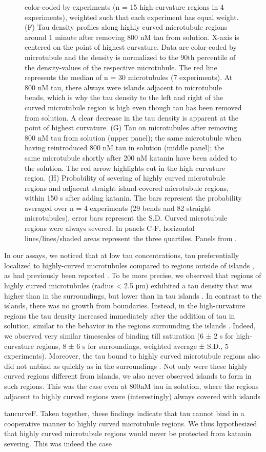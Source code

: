 \begin{figure}[h!]
{color-coded by experiments (n = 15 high-curvature regions in 4 experiments), weighted such that each experiment has equal weight. (F) Tau density profiles along highly curved microtubule regions around 1 minute after removing 800 nM tau from solution. X-axis is centered on the point of highest curvature. Data are color-coded by microtubule and the density is normalized to the 90th percentile of the density-values of the respective microtubule. The red line represents the median of n = 30 microtubules (7 experiments). At 800 nM tau, there always were islands adjacent to microtubule bends, which is why the tau density to the left and right of the curved microtubule region is high even though tau has been removed from solution. A clear decrease in the tau density is apparent at the point of highest curvature. (G) Tau on microtubules after removing 800 nM tau from solution (upper panel); the same microtubule when having reintroduced 800 nM tau in solution (middle panel); the same microtubule shortly after 200 nM katanin have been added to the solution. The red arrow highlights cut in the high curvature region. (H) Probability of severing of highly curved microtubule regions and adjacent straight island-covered microtubule regions, within 150 s after adding katanin. The bars represent the probability averaged over n = 4 experiments (29 bends and 82 straight microtubules), error bars represent the S.D. Curved microtubule regions were always severed. In panels C-F, horizontal lines/lines/shaded areas represent the three quartiles. Panels from \cite{Siahaan2019a}.
	}\label{taucurve}
\end{figure}
In our assays, we noticed that at low tau concentrations, tau preferentially localized to highly-curved microtubules compared to regions outside of islands , as had previously been reported \parencite{Samsonov2004}. To be more precise, we observed that regions of highly curved microtubules (radius < 2.5 µm) exhibited a tau density that was higher than in the surroundings, but lower than in tau islands . In contrast to the islands, there was no growth from boundaries. Instead, in the high-curvature regions the tau density increased immediately after the addition of tau in solution, similar to the behavior in the regions surrounding the islands . Indeed, we observed very similar timescales of binding till saturation (6 ± 2 s for high-curvature regions, 8 ± 6 s for surroundings, weighted average ± S.D., 5 experiments). Moreover, the tau bound to highly curved microtubule regions also did not unbind as quickly as in the surroundings . Not only were these highly curved regions different from islands, we also never observed islands to form in such regions. This was the case even at 800nM tau in solution, where the regions adjacent to highly curved regions were (interestingly) always covered with islands \par{taucurve}{F}. Taken together, these findings indicate that tau cannot bind in a cooperative manner to highly curved microtubule regions. We thus hypothesized that highly curved microtubule regions would never be protected from katanin severing. This was indeed the case 